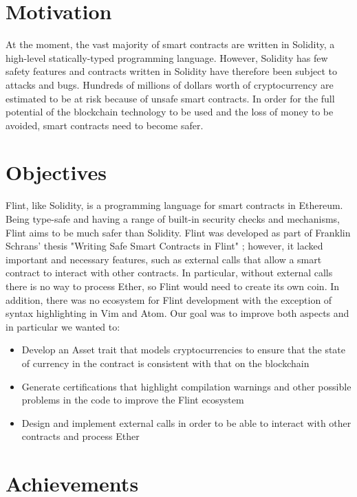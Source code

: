 \section{Motivation}

At the moment, the vast majority of smart contracts are written in Solidity, a high-level statically-typed programming language. However, Solidity has few safety features and contracts written in Solidity have therefore been subject to attacks and bugs. Hundreds of millions of dollars worth of cryptocurrency are estimated to be at risk because of unsafe smart contracts. In order for the full potential of the blockchain technology to be used and the loss of money to be avoided, smart contracts need to become safer.

\section{Objectives}

Flint, like Solidity, is a programming language for smart contracts in Ethereum. Being type-safe and having a range of built-in security checks and mechanisms, Flint aims to be much safer than Solidity. Flint was developed as part of Franklin Schrans' thesis "Writing Safe Smart Contracts in Flint"
\cite{flint}
; however, it lacked important and necessary features, such as external calls that allow a smart contract to interact with other contracts. In particular, without external calls there is no way to process Ether, so Flint would need to create its own coin. In addition, there was no ecosystem for Flint development with the exception of syntax highlighting in Vim and Atom. Our goal was to improve both aspects and in particular we wanted to:

\begin{itemize}
	\item Develop an Asset trait that models cryptocurrencies to ensure that the state of currency in the contract is consistent with that on the blockchain
	\item Generate certifications that highlight compilation warnings and other possible problems in the code to improve the Flint ecosystem
	\item Design and implement external calls in order to be able to interact with other contracts and process Ether
\end{itemize}

\section{Achievements}

